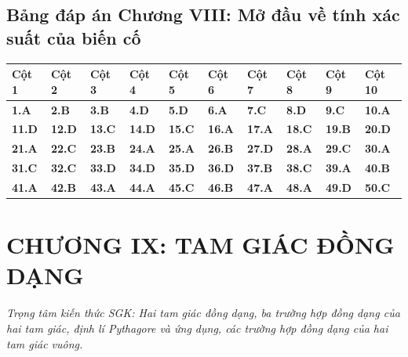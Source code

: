 \documentclass[11pt,a4paper]{article}
\begin{document}
\subsection*{\color{primary} Bảng đáp án Chương VIII: Mở đầu về tính xác suất của biến cố}
\begin{center}
\renewcommand{\arraystretch}{1.25}
\begin{tabularx}{\textwidth}{*{10}{>{\centering\arraybackslash}X}}
\toprule
\textbf{\color{primary} Cột 1} & \textbf{\color{primary} Cột 2} & \textbf{\color{primary} Cột 3} & \textbf{\color{primary} Cột 4} & \textbf{\color{primary} Cột 5} & \textbf{\color{primary} Cột 6} & \textbf{\color{primary} Cột 7} & \textbf{\color{primary} Cột 8} & \textbf{\color{primary} Cột 9} & \textbf{\color{primary} Cột 10} \\
\midrule
\textbf{1.A} & \textbf{2.B} & \textbf{3.B} & \textbf{4.D} & \textbf{5.D} & \textbf{6.A} & \textbf{7.C} & \textbf{8.D} & \textbf{9.C} & \textbf{10.A} \\
\rowcolor{rowtint} \textbf{11.D} & \textbf{12.D} & \textbf{13.C} & \textbf{14.D} & \textbf{15.C} & \textbf{16.A} & \textbf{17.A} & \textbf{18.C} & \textbf{19.B} & \textbf{20.D} \\
\textbf{21.A} & \textbf{22.C} & \textbf{23.B} & \textbf{24.A} & \textbf{25.A} & \textbf{26.B} & \textbf{27.D} & \textbf{28.A} & \textbf{29.C} & \textbf{30.A} \\
\rowcolor{rowtint} \textbf{31.C} & \textbf{32.C} & \textbf{33.D} & \textbf{34.D} & \textbf{35.D} & \textbf{36.D} & \textbf{37.B} & \textbf{38.C} & \textbf{39.A} & \textbf{40.B} \\
\textbf{41.A} & \textbf{42.B} & \textbf{43.A} & \textbf{44.A} & \textbf{45.C} & \textbf{46.B} & \textbf{47.A} & \textbf{48.A} & \textbf{49.D} & \textbf{50.C} \\
\bottomrule
\end{tabularx}
\end{center}\vspace{10pt}
\section*{\color{primary} CHƯƠNG IX: TAM GIÁC ĐỒNG DẠNG}
\textit{Trọng tâm kiến thức SGK: Hai tam giác đồng dạng, ba trường hợp đồng dạng của hai tam giác, định lí Pythagore và ứng dụng, các trường hợp đồng dạng của hai tam giác vuông.}\par\vspace{4pt}
\end{document}
